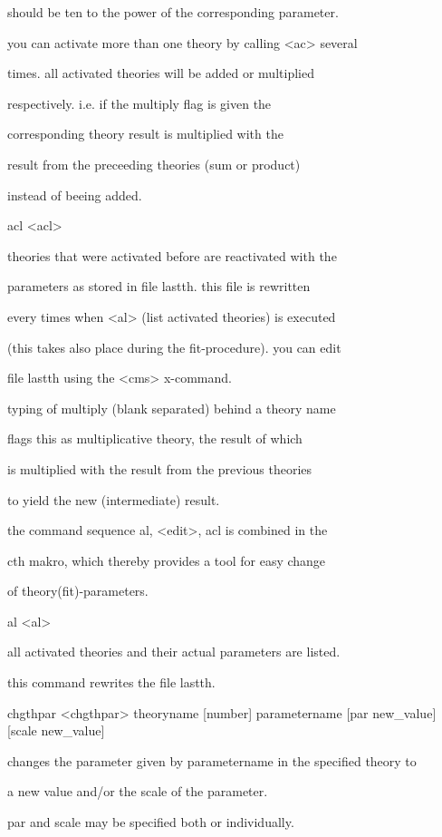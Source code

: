 \documentclass[]{article}
\begin{document}
should be ten to the power of the corresponding parameter.

you can activate more than one theory by calling
\textless{}ac\textgreater{} several

times. all activated theories will be added or multiplied

respectively. i.e. if the multiply flag is given the

corresponding theory result is multiplied with the

result from the preceeding theories (sum or product)

instead of beeing added.

acl \textless{}acl\textgreater{}

theories that were activated before are reactivated with the

parameters as stored in file lastth. this file is rewritten

every times when \textless{}al\textgreater{} (list activated theories)
is executed

(this takes also place during the fit-procedure). you can edit

file lastth using the \textless{}cms\textgreater{} x-command.

typing of multiply (blank separated) behind a theory name

flags this as multiplicative theory, the result of which

is multiplied with the result from the previous theories

to yield the new (intermediate) result.

the command sequence al, \textless{}edit\textgreater{}, acl is combined
in the

cth makro, which thereby provides a tool for easy change

of theory(fit)-parameters.

al \textless{}al\textgreater{}

all activated theories and their actual parameters are listed.

this command rewrites the file lastth.

chgthpar \textless{}chgthpar\textgreater{} theoryname {[}number{]}
parametername {[}par new\_value{]} {[}scale new\_value{]}

changes the parameter given by parametername in the specified theory to

a new value and/or the scale of the parameter.

par and scale may be specified both or individually.
\end{document}
